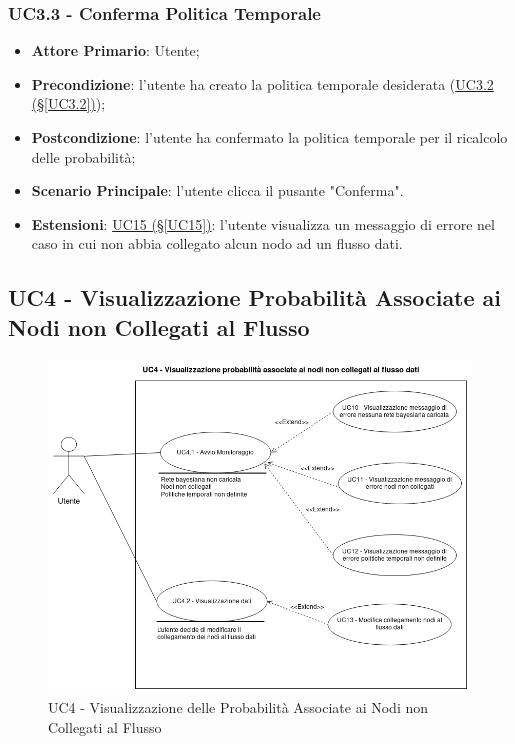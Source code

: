 \subsubsection{UC3.3 - Conferma Politica Temporale}\label{UC3.3}
\begin{itemize}
	\item \textbf{Attore Primario}: Utente; 
	\item \textbf{Precondizione}: l'utente ha creato la politica temporale desiderata (\hyperref[UC3.2]{UC3.2 (§\ref*{UC3.2})});
	\item \textbf{Postcondizione}: l'utente ha confermato la politica temporale per il ricalcolo delle probabilità; 
	\item \textbf{Scenario Principale}: l'utente clicca il pusante "Conferma".
	\item \textbf{Estensioni}: \hyperref[UC15]{UC15 (§\ref*{UC15})}: l'utente visualizza un messaggio di errore nel caso in cui non abbia collegato alcun nodo ad un flusso dati.
\end{itemize}

\newpage

\subsection{UC4 - Visualizzazione Probabilità Associate ai Nodi non Collegati al Flusso}\label{UC4}

\begin{figure}[H]
\centering
\includegraphics[scale=0.4]{./images/UC4.png}
\caption{UC4 - Visualizzazione delle Probabilità Associate ai Nodi non Collegati al Flusso}
\end{figure}

